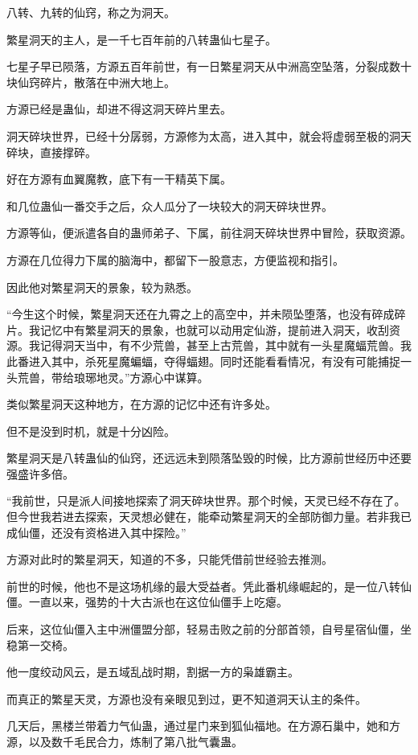 \begin{this_body}
八转、九转的仙窍，称之为洞天。

繁星洞天的主人，是一千七百年前的八转蛊仙七星子。

七星子早已陨落，方源五百年前世，有一日繁星洞天从中洲高空坠落，分裂成数十块仙窍碎片，散落在中洲大地上。

方源已经是蛊仙，却进不得这洞天碎片里去。

洞天碎块世界，已经十分孱弱，方源修为太高，进入其中，就会将虚弱至极的洞天碎块，直接撑碎。

好在方源有血翼魔教，底下有一干精英下属。

和几位蛊仙一番交手之后，众人瓜分了一块较大的洞天碎块世界。

方源等仙，便派遣各自的蛊师弟子、下属，前往洞天碎块世界中冒险，获取资源。

方源在几位得力下属的脑海中，都留下一股意志，方便监视和指引。

因此他对繁星洞天的景象，较为熟悉。

“今生这个时候，繁星洞天还在九霄之上的高空中，并未陨坠堕落，也没有碎成碎片。我记忆中有繁星洞天的景象，也就可以动用定仙游，提前进入洞天，收刮资源。我记得洞天当中，有不少荒兽，甚至上古荒兽，其中就有一头星魔蝠荒兽。我此番进入其中，杀死星魔蝙蝠，夺得蝠翅。同时还能看看情况，有没有可能捕捉一头荒兽，带给琅琊地灵。”方源心中谋算。

类似繁星洞天这种地方，在方源的记忆中还有许多处。

但不是没到时机，就是十分凶险。

繁星洞天是八转蛊仙的仙窍，还远远未到陨落坠毁的时候，比方源前世经历中还要强盛许多倍。

“我前世，只是派人间接地探索了洞天碎块世界。那个时候，天灵已经不存在了。但今世我若进去探索，天灵想必健在，能牵动繁星洞天的全部防御力量。若非我已成仙僵，还没有资格进入其中探险。”

方源对此时的繁星洞天，知道的不多，只能凭借前世经验去推测。

前世的时候，他也不是这场机缘的最大受益者。凭此番机缘崛起的，是一位八转仙僵。一直以来，强势的十大古派也在这位仙僵手上吃瘪。

后来，这位仙僵入主中洲僵盟分部，轻易击败之前的分部首领，自号星宿仙僵，坐稳第一交椅。

他一度绞动风云，是五域乱战时期，割据一方的枭雄霸主。

而真正的繁星天灵，方源也没有亲眼见到过，更不知道洞天认主的条件。

几天后，黑楼兰带着力气仙蛊，通过星门来到狐仙福地。在方源石巢中，她和方源，以及数千毛民合力，炼制了第八批气囊蛊。


\end{this_body}
